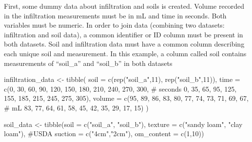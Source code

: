 \documentclass[
]{article}
\newenvironment{Shaded}{\begin{snugshade}}{\end{snugshade}}
\newcommand{\AttributeTok}[1]{\textcolor[rgb]{0.40,0.45,0.13}{#1}}
\newcommand{\CommentTok}[1]{\textcolor[rgb]{0.37,0.37,0.37}{#1}}
\newcommand{\DecValTok}[1]{\textcolor[rgb]{0.68,0.00,0.00}{#1}}
\newcommand{\FunctionTok}[1]{\textcolor[rgb]{0.28,0.35,0.67}{#1}}
\newcommand{\NormalTok}[1]{\textcolor[rgb]{0.00,0.23,0.31}{#1}}
\newcommand{\OtherTok}[1]{\textcolor[rgb]{0.00,0.23,0.31}{#1}}
\newcommand{\StringTok}[1]{\textcolor[rgb]{0.13,0.47,0.30}{#1}}
\begin{document}
First, some dummy data about infiltration and soils is created. Volume
recorded in the infiltration measurements must be in mL and time in
seconds. Both variables must be numeric. In order to join data
(combining two datasets: infiltration and soil data), a common
identifier or ID column must be present in both datasets. Soil and
infiltration data must have a common column describing each unique soil
and measurement. In this example, a column called soil contains
measurements of ``soil\_a'' and ``soil\_b'' in both datasets

\begin{Shaded}
\begin{Highlighting}[]
\NormalTok{infiltration\_data }\OtherTok{\textless{}{-}} \FunctionTok{tibble}\NormalTok{(}
  \AttributeTok{soil =} \FunctionTok{c}\NormalTok{(}\FunctionTok{rep}\NormalTok{(}\StringTok{"soil\_a"}\NormalTok{,}\DecValTok{11}\NormalTok{), }\FunctionTok{rep}\NormalTok{(}\StringTok{"soil\_b"}\NormalTok{,}\DecValTok{11}\NormalTok{)),}
  \AttributeTok{time =} \FunctionTok{c}\NormalTok{(}\DecValTok{0}\NormalTok{, }\DecValTok{30}\NormalTok{, }\DecValTok{60}\NormalTok{, }\DecValTok{90}\NormalTok{, }\DecValTok{120}\NormalTok{, }\DecValTok{150}\NormalTok{, }\DecValTok{180}\NormalTok{, }\DecValTok{210}\NormalTok{, }\DecValTok{240}\NormalTok{, }\DecValTok{270}\NormalTok{, }\DecValTok{300}\NormalTok{, }\CommentTok{\# seconds}
           \DecValTok{0}\NormalTok{, }\DecValTok{35}\NormalTok{, }\DecValTok{65}\NormalTok{, }\DecValTok{95}\NormalTok{, }\DecValTok{125}\NormalTok{, }\DecValTok{155}\NormalTok{, }\DecValTok{185}\NormalTok{, }\DecValTok{215}\NormalTok{, }\DecValTok{245}\NormalTok{, }\DecValTok{275}\NormalTok{, }\DecValTok{305}\NormalTok{),}
  \AttributeTok{volume =} \FunctionTok{c}\NormalTok{(}\DecValTok{95}\NormalTok{, }\DecValTok{89}\NormalTok{, }\DecValTok{86}\NormalTok{, }\DecValTok{83}\NormalTok{, }\DecValTok{80}\NormalTok{, }\DecValTok{77}\NormalTok{, }\DecValTok{74}\NormalTok{, }\DecValTok{73}\NormalTok{, }\DecValTok{71}\NormalTok{, }\DecValTok{69}\NormalTok{, }\DecValTok{67}\NormalTok{, }\CommentTok{\# mL}
             \DecValTok{83}\NormalTok{, }\DecValTok{77}\NormalTok{, }\DecValTok{64}\NormalTok{, }\DecValTok{61}\NormalTok{, }\DecValTok{58}\NormalTok{, }\DecValTok{45}\NormalTok{, }\DecValTok{42}\NormalTok{, }\DecValTok{35}\NormalTok{, }\DecValTok{29}\NormalTok{, }\DecValTok{17}\NormalTok{, }\DecValTok{15}\NormalTok{)}
\NormalTok{)}

\NormalTok{soil\_data }\OtherTok{\textless{}{-}} \FunctionTok{tibble}\NormalTok{(}\AttributeTok{soil =} \FunctionTok{c}\NormalTok{(}\StringTok{"soil\_a"}\NormalTok{, }\StringTok{"soil\_b"}\NormalTok{),}
                    \AttributeTok{texture =} \FunctionTok{c}\NormalTok{(}\StringTok{"sandy loam"}\NormalTok{, }\StringTok{"clay loam"}\NormalTok{), }\CommentTok{\#USDA}
                    \AttributeTok{suction =} \FunctionTok{c}\NormalTok{(}\StringTok{"4cm"}\NormalTok{,}\StringTok{"2cm"}\NormalTok{),}
                    \AttributeTok{om\_content =} \FunctionTok{c}\NormalTok{(}\DecValTok{1}\NormalTok{,}\DecValTok{10}\NormalTok{))}


\end{Highlighting}
\end{Shaded}
\end{document}
